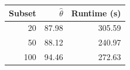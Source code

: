 \begin{tabular}{rrr}
\toprule
Subset & $\hat\theta$ & Runtime (s) \\
\midrule
20 & 87.98 & 305.59 \\
50 & 88.12 & 240.97 \\
100 & 94.46 & 272.63 \\
\bottomrule
\end{tabular}
